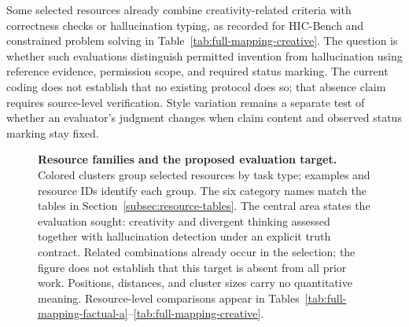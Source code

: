 Some selected resources already combine creativity-related criteria with
correctness checks or hallucination typing, as recorded for HIC-Bench and
constrained problem solving in Table~\ref{tab:full-mapping-creative}.
The question is whether such evaluations distinguish permitted invention
from hallucination using reference evidence, permission scope, and required
status marking. The current coding does not establish that no existing
protocol does so; that absence claim requires source-level verification.
Style variation remains a separate test of whether an evaluator's judgment
changes when claim content and observed status marking stay fixed.

\begin{figure}[!ht]
\centering
\resizebox{\textwidth}{!}{}
\caption{\textbf{Resource families and the proposed evaluation target.}
Colored clusters group selected resources by task type; examples and resource
IDs identify each group. The six category names match the tables in
Section~\ref{subsec:resource-tables}.
The central area states the evaluation sought: creativity and divergent
thinking assessed together with hallucination detection under an explicit
truth contract. Related combinations already occur in the selection; the
figure does not establish that this target is absent from all prior work.
Positions, distances, and cluster sizes carry no quantitative meaning.
Resource-level comparisons appear in
Tables~\ref{tab:full-mapping-factual-a}--\ref{tab:full-mapping-creative}.}
\label{fig:profiles}
\end{figure}
\FloatBarrier

